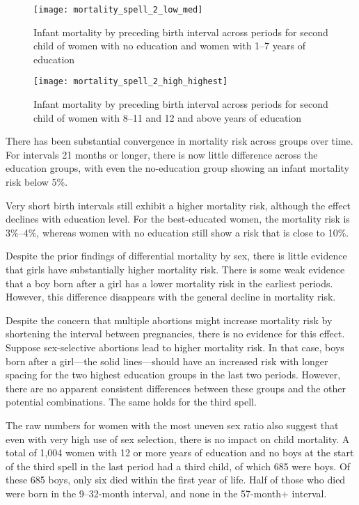 \documentclass[12pt,letterpaper]{article}
\begin{document}
\begin{figure}
\centering
\texttt{[image: mortality\_spell\_2\_low\_med]}
\caption{Infant mortality by preceding birth interval across periods for second child of women with 
no education and women with 1--7 years of education}
\label{fig:mortality_low_med}
\end{figure}


\begin{figure}
\centering
\texttt{[image: mortality\_spell\_2\_high\_highest]}
\caption{Infant mortality by preceding birth interval across periods for second child of women with 
8--11 and 12 and above years of education}
\label{fig:mortality_high_highest}
\end{figure}



There has been substantial convergence in mortality risk across groups over time.
For intervals 21 months or longer, there is now little difference across 
the education groups, with even the no-education group showing an infant mortality risk 
below 5\%.

Very short birth intervals still exhibit a higher mortality risk, although the 
effect declines with education level.
For the best-educated women, the mortality risk is 3\%--4\%,
whereas women with no education still show a risk that is close to 10\%.

Despite the prior findings of differential mortality by sex, there is little evidence 
that girls have substantially higher mortality risk.
There is some weak evidence that a boy born after a girl has a lower mortality
risk in the earliest periods.
However, this difference disappears with the general decline in mortality risk. 

Despite the concern that multiple abortions might increase mortality risk by shortening 
the interval between pregnancies, there is no evidence for this effect. 
Suppose sex-selective abortions lead to higher mortality risk. In that case, boys born 
after a girl---the solid lines---should have an increased risk with longer spacing for 
the two highest education groups in the last two periods.
However, there are no apparent consistent differences between these groups and the other 
potential combinations. 
The same holds for the third spell.

The raw numbers for women with the most uneven sex ratio also suggest that even with 
very high use of sex selection, there is no impact on child mortality. 
A total of 1,004 women with 12 or more years of education and no boys at the start of 
the third spell in the last period had a third child, of which 685 were boys. 
Of these 685 boys, only six died within the first year of life. 
Half of those who died were born in the 9--32-month interval, and none in the 57-month+ 
interval.
\end{document}
